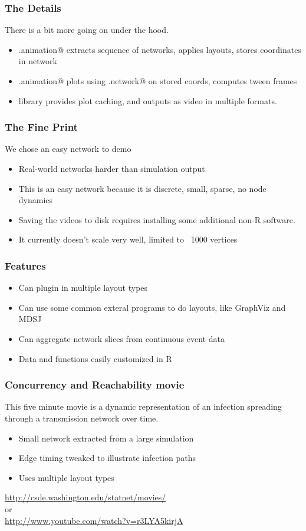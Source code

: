\documentclass{beamer}
\begin{document}
\begin{frame}[fragile]
\frametitle{The Details}
There is a bit more going on under the hood.
\begin{itemize}
\item \verb@compute.animation@ extracts sequence of networks, applies layouts, stores coordinates in network
\item \verb@render.animation@ plots using \verb@plot.network@ on stored coords, computes tween frames
\item \verb@animation@ library provides plot caching, and outputs as video in multiple formats.
\end{itemize}
\end{frame}

\begin{frame}[fragile]
\frametitle{The Fine Print}
We chose an easy network to demo
\begin{itemize}
\item Real-world networks harder than simulation output
\item This is an easy network because it is discrete, small, sparse, no node dynamics
\item Saving the videos to disk requires installing some additional non-R software.
\item It currently doesn't scale very well, limited to ~1000 vertices
\end{itemize}
\end{frame}

\begin{frame}[fragile]
\frametitle{Features}
\begin{itemize}
\item Can plugin in multiple layout types
\item Can use some common exteral programs to do layouts, like GraphViz and MDSJ
\item Can aggregate network slices from continuous event data
\item Data and functions easily customized in R
\end{itemize}
\end{frame}

\begin{frame}[fragile]
\frametitle{Concurrency and Reachability movie}
This five minute movie is a dynamic representation of an infection spreading through a transmission network over time.
\begin{itemize}
\item Small network extracted from a large simulation
\item Edge timing tweaked to illustrate infection paths
\item Uses multiple layout types
\end{itemize}
\url{http://csde.washington.edu/statnet/movies/}\\
or\\
\url{http://www.youtube.com/watch?v=r3LYA5kirjA}

\end{frame}
\end{document}
